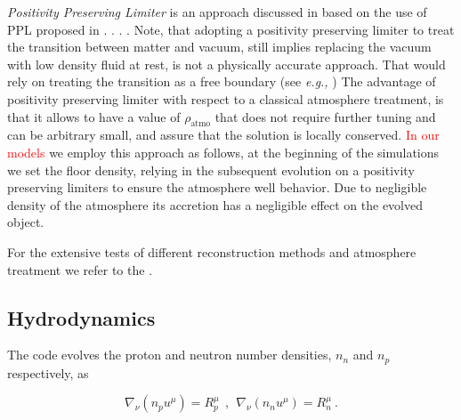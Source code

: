 \textit{Positivity Preserving Limiter} is an approach discussed in \cite{Radice:2013apa} based on the use of PPL proposed in \cite{Hu:2013}. . .
. 
Note, that adopting a positivity preserving limiter to treat the transition between matter and vacuum, still implies replacing the vacuum with low density fluid at rest, is not a physically accurate approach. That would rely on treating the transition as a free boundary (see \textit{e.g.,} \cite{Kastaun:2006}) The advantage of positivity preserving limiter with respect to a classical atmosphere treatment, is that it allows to have a value of $\rho_{\text{atmo}}$ that does not require further tuning and can be arbitrary small, and assure that the solution is locally conserved. 
\textcolor{red}{In our models} we employ this approach as follows, at the beginning of the simulations we set the floor density, relying in the subsequent evolution on a positivity preserving limiters to ensure the atmosphere well behavior. Due to negligible density of the atmosphere its accretion has a negligible effect on the evolved object. 

For the extensive tests of different reconstruction methods and atmosphere treatment we refer to the \cite{Radice:2013apa}.


\subsection{Hydrodynamics}




The code evolves the proton and neutron number densities, $n_n$ and $n_p$
respectively, as 

\begin{equation}
\label{eq:wthc:pndens}
\nabla_\nu (n_p u^\mu) = R_p^\mu \ \ , \ \ 
\nabla_\nu (n_n u^\mu) = R_n^\mu \ .
\end{equation}



